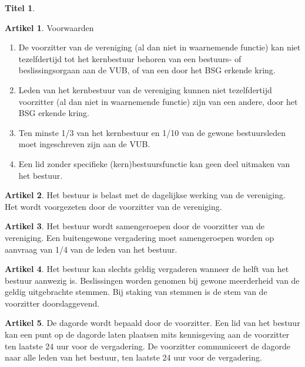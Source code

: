 \documentclass[a4paper,10pt]{article}
\theoremstyle{definition}
\newtheorem{titel}{\newline\Large Titel}
\newtheorem{artikelbase}{\large Artikel}
\newenvironment{artikel}
  {\begin{artikelbase}}
  {\smallskip
   \end{artikelbase}}
\newcommand{\ttextcr}{\hfill\newline}
\newcommand{\ttextenum}{\mbox{}}
\begin{document}
\begin{titel}
  \begin{artikel}Voorwaarden\ttextenum
    \begin{enumerate}
      \item De voorzitter van de vereniging (al dan niet in waarnemende functie) kan niet tezelfdertijd tot het kernbestuur behoren van een bestuurs- of beslissingsorgaan aan de VUB, of van een door het BSG erkende kring.
      \item Leden van het kernbestuur van de vereniging kunnen niet tezelfdertijd voorzitter (al dan niet in waarnemende functie) zijn van een andere, door het BSG erkende kring. %
      \item Ten minste 1/3 van het kernbestuur en 1/10 van de gewone bestuursleden moet ingeschreven zijn aan de VUB.
      \item Een lid zonder specifieke (kern)bestuursfunctie kan geen deel uitmaken van het bestuur.
    \end{enumerate}
  \end{artikel}

  \begin{artikel}\ttextcr
    Het bestuur is belast met de dagelijkse werking van de vereniging.
    Het wordt voorgezeten door de voorzitter van de vereniging.
  \end{artikel}

  \begin{artikel}\ttextcr
    Het bestuur wordt samengeroepen door de voorzitter van de vereniging.
    Een buitengewone vergadering moet samengeroepen worden op aanvraag van 1/4 van de leden van het bestuur.
  \end{artikel}

  \begin{artikel}\ttextcr
    Het bestuur kan slechts geldig vergaderen wanneer de helft van het bestuur aanwezig is.
    Beslissingen worden genomen bij gewone meerderheid van de geldig uitgebrachte stemmen.
    Bij staking van stemmen is de stem van de voorzitter doorslaggevend.
  \end{artikel}

  \begin{artikel}\ttextcr
    De dagorde wordt bepaald door de voorzitter.
    Een lid van het bestuur kan een punt op de dagorde laten plaatsen mits kennisgeving aan de voorzitter ten laatste 24 uur voor de vergadering.
    De voorzitter communiceert de dagorde naar alle leden van het bestuur, ten laatste 24 uur voor de vergadering.
  \end{artikel}

\end{titel}
\end{document}
